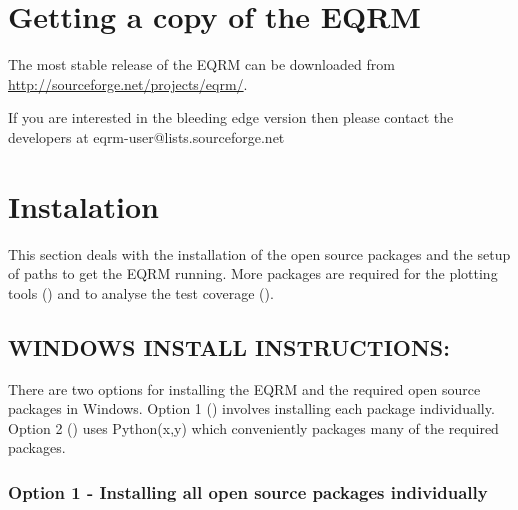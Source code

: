 \documentclass[a4paper, 12pt]{article}
\begin{document}
\section{Getting a copy of the EQRM}

The most stable release of the EQRM can be downloaded from \\
\url{http://sourceforge.net/projects/eqrm/}.

If you are interested in the bleeding edge version then please
contact the developers at eqrm-user@lists.sourceforge.net

\section{Instalation}

This section deals with the installation of the open source packages
and the setup of paths to get the EQRM running. More packages are
required for the plotting tools () and to
analyse the test coverage ().

\subsection{WINDOWS INSTALL INSTRUCTIONS:}

There are two options for installing the EQRM and the required open
source packages in Windows. Option 1 ()
involves installing each package individually. Option 2
() uses Python(x,y) which conveniently
packages many of the required packages.

\subsubsection{Option 1 - Installing all open source packages individually}
\label{sec:windows-option1}
\end{document}

